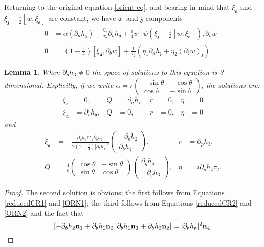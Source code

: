 \documentclass[11pt]{amsart}
\renewcommand{\aa}{\mathfrak{a}}
\newcommand{\zz}{\mathfrak{z}}
\newcommand{\orvar}{Q}
\numberwithin{equation}{section}
\newtheorem{lma}[equation]{Lemma}
\theoremstyle{definition}
\theoremstyle{remark}
\begin{document}

Returning to the original equation \eqref{orient-eq}, and bearing in mind that $\xi_{\aa}$ and $\xi_{\zz}-\frac{1}{2}[w,\xi_{\aa}]$ are constant, we have $\aa$- and $\zz$-components
\begin{align*}
0&=\alpha(\partial_ah_{\zz})+\frac{\eta_2}{\tau_2}\partial_bh_{\aa}+\frac{\epsilon}{4}\psi\left[\psi\left(\xi_{\zz}-\frac{1}{2}[w,\xi_{\aa}]\right),\partial_bw\right]\\
0&=\left(1-\frac{\epsilon}{4}\right)[\xi_{\aa},\partial_bw]+\frac{1}{\tau_2}\left(\eta_1\partial_ah_{\zz}+\eta_2(\partial_bw)_{\zz}\right)
\end{align*}
\begin{lma}
When $\partial_ph_3\neq 0$ the space of solutions to this equation is 3-di\-men\-sional. Explicitly, if we write $\alpha=r\left(\begin{array}{cc}-\sin\theta&-\cos\theta\\ \cos\theta&-\sin\theta\end{array}\right)$, the solutions are:
\begin{align}
\label{Sol1}\tag{S1}\xi_{\aa}&=0,&\orvar&=\partial_ah_{\zz},&r&=0,&\eta&=0\\
\label{Sol2}\tag{S2}\xi_{\aa}&=\partial_bh_{\aa},&\orvar&=0,&r&=0,&\eta&=0
\end{align}
and
\begin{align}
\label{Sol3}\tag{S3}\xi_{\aa}&=-\frac{\partial_ph_4C_{[2}\partial_bh_{1]}}{2\left(1-\frac{\epsilon}{4}\right)|\partial_bh_{\aa}|^2}\left(\begin{array}{c}-\partial_bh_2\\ \partial_bh_1\end{array}\right),&r&=\partial_ph_3,\\
\nonumber \orvar&=\frac{4}{\epsilon}\left(\begin{array}{cc}\cos\theta& -\sin\theta\\ \sin\theta&\cos\theta\end{array}\right)\left(\begin{array}{c}\partial_qh_4\\ -\partial_qh_3\end{array}\right),&\eta&=i\partial_ph_4\tau_2.
\end{align}
\end{lma}
\begin{proof}
The second solution is obvious; the first follows from Equations \eqref{reducedCR1} and \eqref{ORN1}; the third follows from Equations \eqref{reducedCR2} and \eqref{ORN2} and the fact that
\[\left[-\partial_bh_2{\bf n}_1+\partial_bh_1{\bf n}_2,\partial_bh_1{\bf n_1}+\partial_bh_2{\bf n}_2\right]=|\partial_bh_{\aa}|^2{\bf n}_4.\]
\end{proof}
\end{document}
